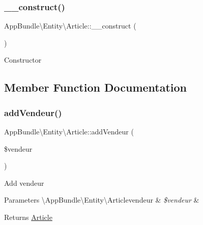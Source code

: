\subsubsection{\texorpdfstring{\+\_\+\+\_\+construct()}{\_\_construct()}}
{\footnotesize\ttfamily App\+Bundle\textbackslash{}\+Entity\textbackslash{}\+Article\+::\+\_\+\+\_\+construct (\begin{DoxyParamCaption}{ }\end{DoxyParamCaption})}

Constructor 

\subsection{Member Function Documentation}
\mbox{\label{class_app_bundle_1_1_entity_1_1_article_a4522b9cb97a5dc19c3d179debf56dcf7}} 
\subsubsection{\texorpdfstring{add\+Vendeur()}{addVendeur()}}
{\footnotesize\ttfamily App\+Bundle\textbackslash{}\+Entity\textbackslash{}\+Article\+::add\+Vendeur (\begin{DoxyParamCaption}\item[{\textbackslash{}\hyperlink{class_app_bundle_1_1_entity_1_1_articlevendeur}{App\+Bundle\textbackslash{}\+Entity\textbackslash{}\+Articlevendeur}}]{\$vendeur }\end{DoxyParamCaption})}

Add vendeur


\begin{DoxyParams}[1]{Parameters}
\textbackslash{}\+App\+Bundle\textbackslash{}\+Entity\textbackslash{}\+Articlevendeur & {\em \$vendeur} & \\
\hline
\end{DoxyParams}
\begin{DoxyReturn}{Returns}
\hyperlink{class_app_bundle_1_1_entity_1_1_article}{Article} 
\end{DoxyReturn}
\mbox{\label{class_app_bundle_1_1_entity_1_1_article_af96d32366fd47aded0527841b172e23f}} 
